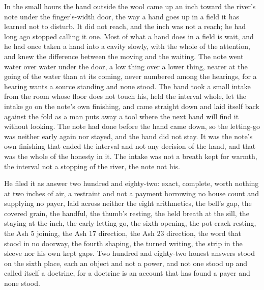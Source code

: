 \scenebreak

In the small hours the hand outside the wool came up an inch toward the river’s note under the finger’s-width door, the way a hand goes up in a field it has learned not to disturb. It did not reach, and the inch was not a reach; he had long ago stopped calling it one. Most of what a hand does in a field is wait, and he had once taken a hand into a cavity slowly, with the whole of the attention, and knew the difference between the moving and the waiting. The note went water over water under the door, a low thing over a lower thing, nearer at the going of the water than at its coming, never numbered among the hearings, for a hearing wants a source standing and none stood. The hand took a small intake from the room whose floor does not touch his, held the interval whole, let the intake go on the note’s own finishing, and came straight down and laid itself back against the fold as a man puts away a tool where the next hand will find it without looking. The note had done before the hand came down, so the letting-go was neither early again nor stayed, and the hand did not stay. It was the note’s own finishing that ended the interval and not any decision of the hand, and that was the whole of the honesty in it. The intake was not a breath kept for warmth, the interval not a stopping of the river, the note not his.

He filed it as answer two hundred and eighty-two: exact, complete, worth nothing at two inches of air, a restraint and not a payment borrowing no house count and supplying no payer, laid across neither the eight arithmetics, the bell’s gap, the covered grain, the handful, the thumb’s resting, the held breath at the sill, the staying at the inch, the early letting-go, the sixth opening, the pot-crack resting, the Ash 5 joining, the Ash 17 direction, the Ash 23 direction, the word that stood in no doorway, the fourth shaping, the turned writing, the strip in the sleeve nor his own kept gaps. Two hundred and eighty-two honest answers stood on the sixth place, each an object and not a power, and not one stood up and called itself a doctrine, for a doctrine is an account that has found a payer and none stood.

